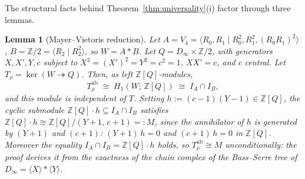 \documentclass[11pt,a4paper]{article}
\newtheorem{lemma}[theorem]{Lemma}
\theoremstyle{remark}
\theoremstyle{plain}
\begin{document}
The structural facts behind Theorem~\ref{thm:universality}(i)
factor through three lemmas.

\begin{lemma}[Mayer--Vietoris reduction]
\label{lem:trans-mod}
Let $A = V_4 = \langle R_0, R_1 \mid R_0^2, R_1^2, (R_0 R_1)^2\rangle$,
$B = \mathbb{Z}/2 = \langle R_2 \mid R_2^2\rangle$, so $W = A * B$.  Let
$Q = D_\infty \times \mathbb{Z}/2$, with generators $X, X', Y, c$
subject to $X^2 = (X')^2 = Y^2 = c^2 = 1$, $X X' = c$, and $c$ central.
Let $T_\rho = \ker(W \twoheadrightarrow Q)$.  Then, as left
$\mathbb{Z}[Q]$-modules,
\[
T_\rho^{\mathrm{ab}} \;\cong\; H_1(W;\, \mathbb{Z}[Q])
   \;\cong\; I_A \cap I_B,
\]
and this module is independent of $T$.  Setting
$h := (c-1)(Y-1) \in \mathbb{Z}[Q]$, the cyclic submodule
$\mathbb{Z}[Q]\cdot h \subseteq I_A \cap I_B$ satisfies
$\mathbb{Z}[Q]\cdot h \cong \mathbb{Z}[Q]/(Y+1,\, c+1) =: M$, since the
annihilator of $h$ is generated by $(Y+1)$ and $(c+1)$:
$(Y+1)\, h = 0$ and $(c+1)\, h = 0$ in $\mathbb{Z}[Q]$.  Moreover the
equality $I_A \cap I_B = \mathbb{Z}[Q]\cdot h$ \emph{holds}, so
$T_\rho^{\mathrm{ab}} \cong M$ unconditionally: the proof derives it
from the exactness of the chain complex of the Bass--Serre tree of
$D_\infty = \langle X \rangle * \langle Y \rangle$.
\end{lemma}
\end{document}

